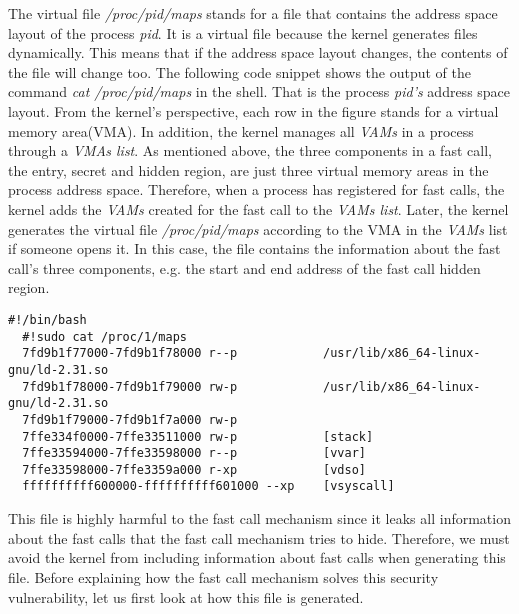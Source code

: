 The virtual file \emph{/proc/pid/maps} stands for a file that contains the address 
space layout of the process \emph{pid}. It is a virtual file because the kernel generates 
files dynamically. This means that if the address space layout changes, the contents 
of the file will change too. The following code snippet shows the output of the 
command  \emph{cat /proc/pid/maps} in the shell. That is the process \emph{pid’s} address space layout. 
From the kernel’s perspective, each row in the figure stands for a virtual memory area(VMA). 
In addition, the kernel manages all \emph{VAMs}\cite{10.5555/983550} in a process through a \emph{VMAs list}. As mentioned above, 
the three components in a fast call, the entry, secret and hidden region, are just three 
virtual memory areas in the process address space. Therefore, when a process has registered 
for fast calls, the kernel adds the \emph{VAMs} created for the fast call to the \emph{VAMs list}. 
Later, the kernel generates the virtual file \emph{/proc/pid/maps} according to the VMA in the 
\emph{VAMs} list if someone opens it. In this case, the file contains the information about 
the fast call's three components, e.g. the start and end address of the fast call hidden region. 

 
\begin{lstlisting}[style=BASHStyle]
  #!/bin/bash
  #!sudo cat /proc/1/maps
  7fd9b1f77000-7fd9b1f78000 r--p            /usr/lib/x86_64-linux-gnu/ld-2.31.so
  7fd9b1f78000-7fd9b1f79000 rw-p            /usr/lib/x86_64-linux-gnu/ld-2.31.so
  7fd9b1f79000-7fd9b1f7a000 rw-p  
  7ffe334f0000-7ffe33511000 rw-p            [stack]
  7ffe33594000-7ffe33598000 r--p            [vvar]
  7ffe33598000-7ffe3359a000 r-xp            [vdso]
  ffffffffff600000-ffffffffff601000 --xp    [vsyscall]
\end{lstlisting}

This file is highly harmful to the fast call mechanism since 
it leaks all information about the fast calls that the fast call 
mechanism tries to hide. Therefore, we must avoid the kernel from 
including information about fast calls when generating this file. 
Before explaining how the fast call mechanism solves this security 
vulnerability, let us first look at how this file is generated.

